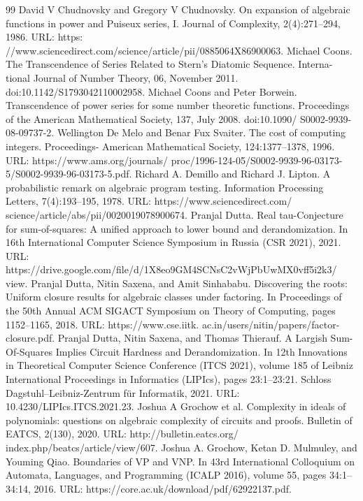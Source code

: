 \documentclass[10pt,a4paper]{article}
\begin{document}
\begin{thebibliography}{99}
 David V Chudnovsky and Gregory V Chudnovsky. On expansion of algebraic functions in power and Puiseux series, I. Journal of Complexity, 2(4):271–294, 1986. URL: https: //www.sciencedirect.com/science/article/pii/0885064X86900063.
 Michael Coons. The Transcendence of Series Related to Stern’s Diatomic Sequence. Interna- tional Journal of Number Theory, 06, November 2011. doi:10.1142/S1793042110002958.
 Michael Coons and Peter Borwein. Transcendence of power series for some number theoretic functions. Proceedings of the American Mathematical Society, 137, July 2008. doi:10.1090/ S0002-9939-08-09737-2.
 Wellington De Melo and Benar Fux Svaiter. The cost of computing integers. Proceedings- American Mathematical Society, 124:1377–1378, 1996. URL: https://www.ams.org/journals/ proc/1996-124-05/S0002-9939-96-03173-5/S0002-9939-96-03173-5.pdf.
 Richard A. Demillo and Richard J. Lipton. A probabilistic remark on algebraic program testing. Information Processing Letters, 7(4):193–195, 1978. URL: https://www.sciencedirect.com/ science/article/abs/pii/0020019078900674.
 Pranjal Dutta. Real tau-Conjecture for sum-of-squares: A unified approach to lower bound and derandomization. In 16th International Computer Science Symposium in Russia (CSR 2021), 2021. URL: https://drive.google.com/file/d/1X8eo9GM4SCNsC2vWjPbUwMX0vff5i2k3/ view.
 Pranjal Dutta, Nitin Saxena, and Amit Sinhababu. Discovering the roots: Uniform closure results for algebraic classes under factoring. In Proceedings of the 50th Annual ACM SIGACT Symposium on Theory of Computing, pages 1152–1165, 2018. URL: https://www.cse.iitk. ac.in/users/nitin/papers/factor-closure.pdf.
 Pranjal Dutta, Nitin Saxena, and Thomas Thierauf. A Largish Sum-Of-Squares Implies Circuit Hardness and Derandomization. In 12th Innovations in Theoretical Computer Science Conference (ITCS 2021), volume 185 of Leibniz International Proceedings in Informatics (LIPIcs), pages 23:1–23:21. Schloss Dagstuhl–Leibniz-Zentrum für Informatik, 2021. URL: 10.4230/LIPIcs.ITCS.2021.23.
 Joshua A Grochow et al. Complexity in ideals of polynomials: questions on algebraic complexity of circuits and proofs. Bulletin of EATCS, 2(130), 2020. URL: http://bulletin.eatcs.org/ index.php/beatcs/article/view/607.
 Joshua A. Grochow, Ketan D. Mulmuley, and Youming Qiao. Boundaries of VP and VNP. In 43rd International Colloquium on Automata, Languages, and Programming (ICALP 2016), volume 55, pages 34:1–34:14, 2016. URL: https://core.ac.uk/download/pdf/62922137.pdf.

\end{thebibliography}
\end{document}
